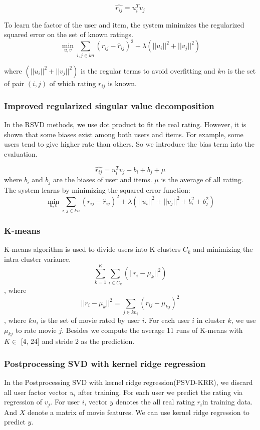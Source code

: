\documentclass[10pt,conference,compsocconf]{IEEEtran}
\begin{document}
$$ \hat{r_{ij}}=u_{i}^{T}v_{j} $$

To learn the factor of the user and item, the system minimizes the regularized squared error on the set of known ratings.
$$  \min \limits_{u, v} \sum_{i, j\in kn} (r_{ij} - \hat r_{ij})^2 + \lambda (||u_i||^2 + ||v_j||^2)  $$

where $ (||u_i||^2 + ||v_j||^2)$ is the regular terms to avoid overfitting and $kn$ is the set of pair $(i, j)$ of which rating $r_{ij}$ is known.

\subsubsection{Improved regularized singular value decomposition}
In the RSVD methods, we use dot product to fit the real rating. However, it is shown that some biases exist among both users and items. For example, some users tend to give higher rate than others. So we introduce the bias term into the evaluation.

$$ \hat{r_{ij}}=u_{i}^{T}v_{j} + b_i + b_j  + \mu $$
where $b_i$ and $b_j$ are the biases of user and items. $\mu$ is the average of all rating. The system learns by minimizing the squared error function:
$$  \min \limits_{u, v} \sum_{i, j\in kn} (r_{ij} - \hat r_{ij})^2 + \lambda (||u_i||^2 + ||v_j||^2 + b_i^2 + b_j^2)  $$

\subsubsection{K-means}
 K-means algorithm is used to divide users into K clusters $C_k$ and minimizing the intra-cluster variance.
 $$   \sum_{k=1}^K \sum_{i \in C_k} (||r_{i}-\mu_k||^2)  $$, where $$  ||r_{i}-\mu_k||^2 = \sum_{j \in kn_i}(r_{ij}-\mu_{kj})^2  $$, where $kn_i$ is the set of movie rated by user $i$. 
 For each user $i$ in cluster $k$, we use $\mu_{kj}$ to rate movie $j$. Besides we compute the average 11 runs of K-means with $K\in$ [4, 24] and stride 2 as the prediction.

\subsubsection{Postprocessing SVD with kernel ridge regression}
In the Postprocessing SVD with kernel ridge regression(PSVD-KRR), we discard all user factor vector $u_i$ after training. For each user we predict the rating via regression of $v_j$. For user $i$, vector $y$ denotes the all real rating $r_i$in training data. And $X$ denote a matrix of movie features. We can use kernel ridge regression to predict $y$.
\end{document}
